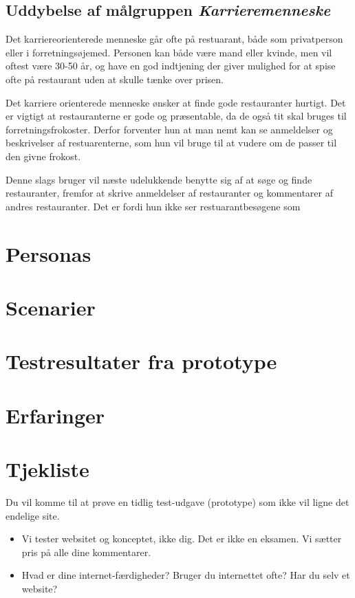 \documentclass[a4paper, 12pt]{article}
\begin{document}
\subsection{Uddybelse af målgruppen \emph{Karrieremenneske}}
Det karriereorienterede menneske går ofte på restuarant, både som privatperson eller i forretningsøjemed. Personen kan både være mand eller kvinde, men vil oftest være 30-50 år, og have en god indtjening der giver mulighed for at spise ofte på restaurant uden at skulle tænke over prisen.

Det karriere orienterede menneske ønsker at finde gode restauranter hurtigt. Det er vigtigt at restauranterne er gode og præsentable, da de også tit skal bruges til forretningsfrokoster. Derfor forventer hun at man nemt kan se anmeldelser og beskrivelser af restuarenterne, som hun vil bruge til at vudere om de passer til den givne frokost. 

Denne slags bruger vil næste udelukkende benytte sig af at søge og finde restauranter, fremfor at skrive anmeldelser af restauranter og kommentarer af andres restauranter. Det er fordi hun ikke ser restuarantbesøgene som 


\section{Personas}
\label{sec:Personas}

\section{Scenarier}
\label{sec:Scenarier}

\section{Testresultater fra prototype}
\label{sec:Testresultater fra prototype}

\section{Erfaringer}
\label{sec:Erfaringer}

\clearpage
\appendix

\section*{Tjekliste}

Du vil komme til at prøve en tidlig test-udgave (prototype) som ikke vil ligne det endelige site.
\begin{itemize}
\item Vi tester websitet og konceptet, ikke dig. Det er ikke en
  eksamen. Vi sætter pris på alle dine kommentarer.
\item Hvad er dine internet-færdigheder? Bruger du internettet ofte?
  Har du selv et website?
\end{itemize}
\end{document}

